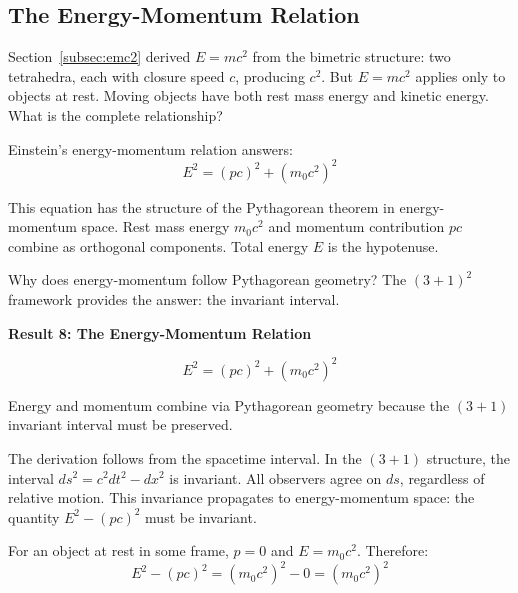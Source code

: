 \documentclass[aps,prd,preprint,superscriptaddress,showpacs,preprintnumbers,amsmath,amssymb,nofootinbib]{revtex4-2}
\begin{document}
\subsection{The Energy-Momentum Relation}
\label{subsec:energy-momentum}

Section~\ref{subsec:emc2} derived $E = mc^2$ from the bimetric structure: two tetrahedra, each with closure speed $c$, producing $c^2$. But $E = mc^2$ applies only to objects at rest. Moving objects have both rest mass energy and kinetic energy. What is the complete relationship?

Einstein's energy-momentum relation answers:
\begin{equation}
E^2 = (pc)^2 + (m_0 c^2)^2
\end{equation}

This equation has the structure of the Pythagorean theorem in energy-momentum space. Rest mass energy $m_0 c^2$ and momentum contribution $pc$ combine as orthogonal components. Total energy $E$ is the hypotenuse.

Why does energy-momentum follow Pythagorean geometry? The $(3+1)^2$ framework provides the answer: the invariant interval.

\vspace{1.5em}
\noindent
\colorbox{resultgreen}{\parbox{\dimexpr\textwidth-2\fboxsep\relax}{%
\vspace{0.8em}
\centering
\textbf{\large Result 8: The Energy-Momentum Relation}

\vspace{0.5em}
\boldmath
\begin{equation}
E^2 = (pc)^2 + (m_0 c^2)^2
\end{equation}
\unboldmath

\vspace{0.3em}
Energy and momentum combine via Pythagorean geometry because the $(3+1)$ invariant interval must be preserved.
\vspace{0.5em}
}}
\vspace{1cm}

The derivation follows from the spacetime interval. In the $(3+1)$ structure, the interval $ds^2 = c^2 dt^2 - dx^2$ is invariant. All observers agree on $ds$, regardless of relative motion. This invariance propagates to energy-momentum space: the quantity $E^2 - (pc)^2$ must be invariant.

For an object at rest in some frame, $p = 0$ and $E = m_0 c^2$. Therefore:
\begin{equation}
E^2 - (pc)^2 = (m_0 c^2)^2 - 0 = (m_0 c^2)^2
\end{equation}
\end{document}
